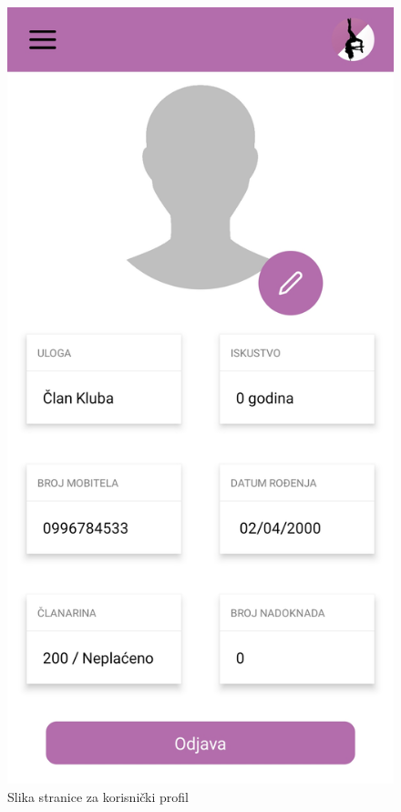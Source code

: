 \documentclass[times, utf8, zavrsni]{fer}
\begin{document}
			\begin{figure}[H]
        			\includegraphics[scale=0.2]{slike/App_profil_neplaceno.jpg}
        			\centering
        			\caption{Slika stranice za korisnički profil}
        			\label{fig:promjene}
        		\end{figure}
        		
\end{document}
